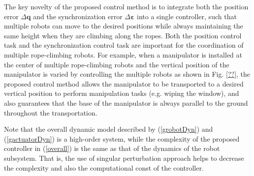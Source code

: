 \documentclass[letterpaper, 10 pt, conference]{ieeeconf}
\begin{document}
The key novelty of the proposed control method is to integrate both the position error $\Delta\bm q$ and the synchronization error $\Delta\bm\varepsilon$ into a single controller, such that multiple robots can move to the desired positions while always maintaining the same height when they are climbing along the ropes. Both the position control task and the synchronization control task are important for the coordination of multiple rope-climbing robots. For example, when a manipulator is installed at the center of multiple rope-climbing robots and the vertical position of the manipulator is varied by controlling the multiple robots as shown in Fig. \ref{??}, the proposed control method allows the manipulator to be transported to a desired vertical position to perform manipulation tasks (e.g. wiping the window), and also guarantees that the base of the manipulator is always parallel to the ground throughout the transportation.

Note that the overall dynamic model described by (\ref{grobotDyn}) and (\ref{gactuatorDyn}) is a high-order system, while the complexity of the proposed controller in (\ref{overall}) is the same as that of the dynamics of the robot subsystem. That is, the use of singular perturbation approach helps to decrease the complexity and also the computational const of the controller.
\end{document}
